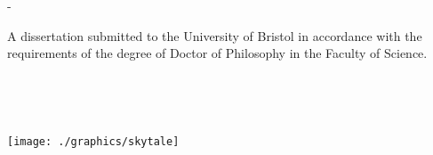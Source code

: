 \begin{titlingpage}
\begin{adjustwidth*}{\unitlength}{-\unitlength}
\begin{center}
\vspace*{\fill}

\begin{minipage}{9cm}
\color{white}
A dissertation submitted to the University of Bristol in accordance with the requirements of the degree of Doctor of Philosophy in the Faculty of Science.
\end{minipage}\\

\vspace*{\fill}



\vspace{10mm}

{\color{white}\large\textsc{ }}\\

\vspace{10mm}

\texttt{[image: ./graphics/skytale]}
\end{center}

\end{adjustwidth*}
\clearpage
\nopagecolor
\cleartooddpage[\emptypage]

\end{titlingpage}